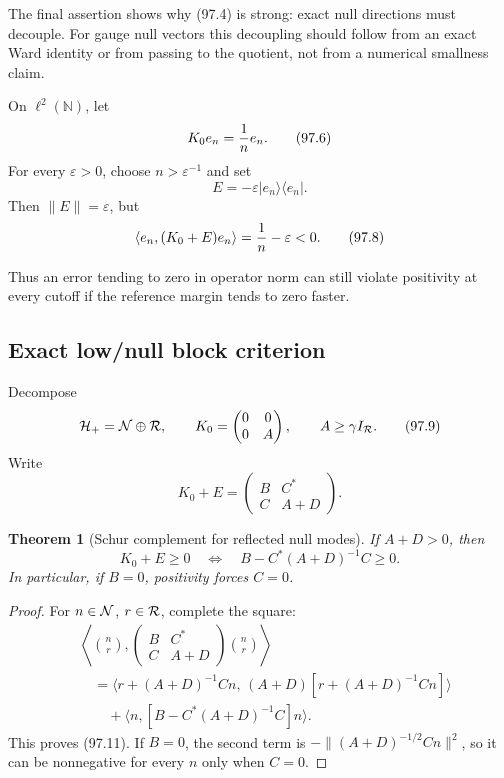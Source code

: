 \documentclass[11pt]{article}
\newtheorem{theorem}{Theorem}[section]
\begin{document}
The final assertion shows why (97.4) is strong: exact null directions
must decouple.  For gauge null vectors this decoupling should follow
from an exact Ward identity or from passing to the quotient, not from
a numerical smallness claim.

\begin{counterexample}
\label{cnt:v11v97-gapless}
On \(\ell^2(\mathbb N)\), let
\[
                              K_0e_n={1\over n}e_n.           \tag{97.6}
\]
For every \(\varepsilon>0\), choose \(n>\varepsilon^{-1}\) and set
\[
                              E=-\varepsilon
                                   |e_n\rangle\langle e_n|.  \tag{97.7}
\]
Then \(\|E\|=\varepsilon\), but
\[
                              \langle e_n,(K_0+E)e_n\rangle
                              ={1\over n}-\varepsilon<0.     \tag{97.8}
\]
\end{counterexample}

Thus an error tending to zero in operator norm can still violate
positivity at every cutoff if the reference margin tends to zero
faster.

\subsection{Exact low/null block criterion}

Decompose
\[
                         {\cal H}_+={\cal N}\oplus{\cal R},
 \qquad
 K_0=\begin{pmatrix}0&0\\0&A\end{pmatrix},\qquad
 A\ge\gamma I_{\cal R}.                                     \tag{97.9}
\]
Write
\[
 K_0+E=
 \begin{pmatrix}
 B&C^*\\
 C&A+D
 \end{pmatrix}.                                              \tag{97.10}
\]

\begin{theorem}[Schur complement for reflected null modes]
\label{thm:v11v97-schur}
If \(A+D>0\), then
\[
 K_0+E\ge0
 \quad\Longleftrightarrow\quad
 B-C^*(A+D)^{-1}C\ge0.                                      \tag{97.11}
\]
In particular, if \(B=0\), positivity forces \(C=0\).
\end{theorem}

\begin{proof}
For \(n\in{\cal N}\), \(r\in{\cal R}\), complete the square:
\[
 \begin{split}
 &\left\langle
 \binom nr,
 \begin{pmatrix}B&C^*\\C&A+D\end{pmatrix}
 \binom nr\right\rangle\\
 &\quad=
 \langle r+(A+D)^{-1}Cn,\,
        (A+D)[r+(A+D)^{-1}Cn]\rangle\\
 &\qquad+
 \langle n,[B-C^*(A+D)^{-1}C]n\rangle.
 \end{split}
\]
This proves (97.11).  If \(B=0\), the second term is
\(-\|(A+D)^{-1/2}Cn\|^2\), so it can be nonnegative for every \(n\)
only when \(C=0\).
\end{proof}
\end{document}

